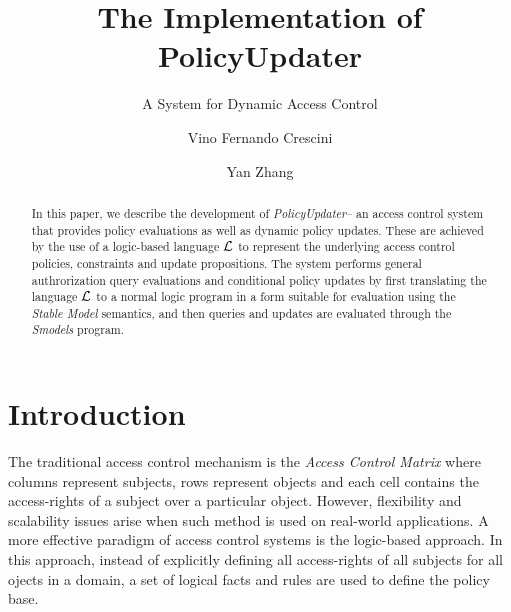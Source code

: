 \documentclass{llncs}
\begin{document}
  \long{}

  \title{The Implementation of PolicyUpdater}
  \subtitle{A System for Dynamic Access Control}

  \author{Vino Fernando Crescini \and Yan Zhang}


  \maketitle

  \begin{abstract}
    In this paper, we describe the development of \emph{PolicyUpdater}\footnotemark -- an
    access control system that provides policy evaluations as well as dynamic
    policy updates. These are achieved by the use of a logic-based language
    $\cal{L}$ to represent the underlying access control policies, constraints
    and update propositions. The system performs general authrorization query
    evaluations and conditional policy updates by first translating the language
    $\cal{L}$ to a normal logic program in a form suitable for evaluation using
    the \emph{Stable Model} semantics, and then queries and updates are
    evaluated through the \emph{Smodels} program.
  \end{abstract}


  \section{Introduction}

    The traditional access control mechanism is the \emph{Access Control Matrix}
    where columns represent subjects, rows represent objects and each cell
    contains the access-rights of a subject over a particular object. However,
    flexibility and scalability issues arise when such method is used on
    real-world applications. A more effective paradigm of access control
    systems is the logic-based approach. In this approach, instead of
    explicitly defining all access-rights of all subjects for all ojects
    in a domain, a set of logical facts and rules are used to define the
    policy base. 
\end{document}
